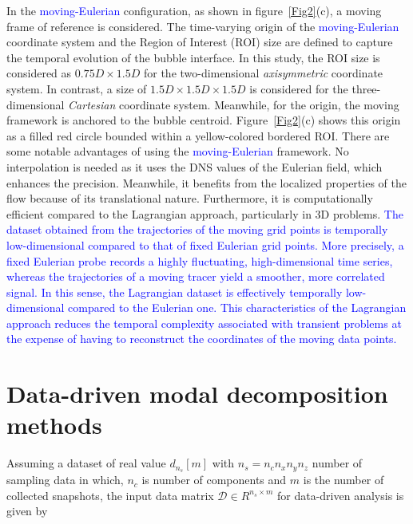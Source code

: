 \documentclass[a4paper,fleqn]{cas-sc}
\newcommand{\hl}[1]{\textcolor{blue}{#1}} %
\newcommand{\hl}[1]{#1} %
\begin{document}
	In the \hl{moving-Eulerian} configuration, as shown in figure~\ref{Fig2}(c), a moving frame of reference is considered. The time-varying origin of the \hl{moving-Eulerian} coordinate system and the Region of Interest (ROI) size are defined to capture the temporal evolution of the bubble interface. In this study, the ROI size is considered as $0.75D\times 1.5D$ for the two-dimensional \textit{axisymmetric} coordinate system. In contrast, a size of $1.5D\times 1.5D \times 1.5D$ is considered for the three-dimensional \textit{Cartesian} coordinate system. Meanwhile, for the origin, the moving framework is anchored to the bubble centroid. Figure~\ref{Fig2}(c) shows this origin as a filled red circle bounded within a yellow-colored bordered ROI. There are some notable advantages of using the \hl{moving-Eulerian} framework. No interpolation is needed as it uses the DNS values of the Eulerian field, which enhances the precision. Meanwhile, it benefits from the localized properties of the flow because of its translational nature. Furthermore, it is computationally efficient compared to the Lagrangian approach, particularly in 3D problems. \hl{The dataset obtained from the trajectories of the moving grid points is temporally low-dimensional compared to that of fixed Eulerian grid points. More precisely, a fixed Eulerian probe records a highly fluctuating, high-dimensional time series, whereas the trajectories of a moving tracer yield a smoother, more correlated signal. In this sense, the Lagrangian dataset is effectively temporally low-dimensional compared to the Eulerian one. This characteristics of the Lagrangian approach reduces the temporal complexity associated with transient problems at the expense of having to reconstruct the coordinates of the moving data points.}
	
	\section{Data-driven modal decomposition methods}
	\label{Data-driven methods}
	Assuming a dataset of real value $d_{n_s}[m]$ with $n_{s}=n_{c}n_{x}n_{y}n_{z}$ number of sampling data in which, $n_{c}$ is number of components and $m$ is the number of collected snapshots, the input data matrix $\mathcal{D}\in R^{n_{s}\times m}$ for data-driven analysis is given by
	
\end{document}
